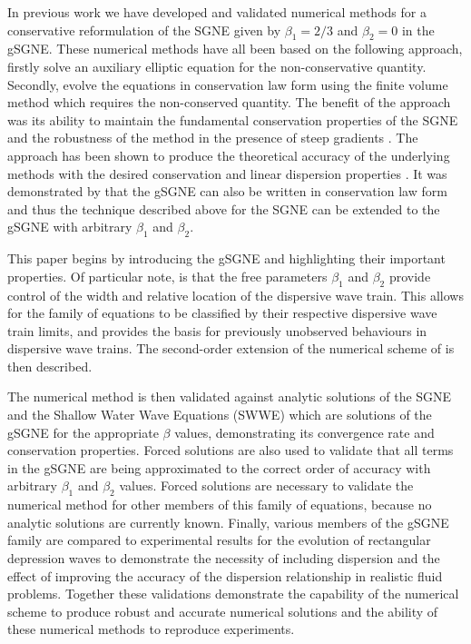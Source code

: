 \documentclass[10pt]{elsarticle}
\newcommand{\hl}[1]{{\color[rgb]{1,0,0}#1}}
\begin{document}
In previous work we have developed and validated numerical methods for a conservative reformulation of the SGNE \cite{Zoppou-2014,Zoppou-etal-2016,Zoppou-etal-2017,Pitt-2019} given by $\beta_1 = 2/3$ and $\beta_2 =0$ in the gSGNE. These numerical methods have all been based on the following approach, firstly solve an auxiliary elliptic equation for the non-conservative quantity. Secondly, evolve the equations in conservation law form using the finite volume method which requires the non-conserved quantity. The benefit of the approach was its ability to maintain the fundamental conservation properties of the SGNE \cite{Pitt-2019} and the robustness of the method in the presence of steep gradients \cite{Pitt-2018-61}. The approach has been shown to produce the theoretical accuracy of the underlying methods \cite{Zoppou-etal-2017,Pitt-2019} with the desired conservation and linear dispersion properties \cite{Pitt-2019}. It was demonstrated by \citet{Clamond-Dutykh-2018-237} that the gSGNE can also be written in conservation law form and thus the technique described above for the SGNE can be extended to the gSGNE with arbitrary $\beta_1$ and $\beta_2$.

This paper begins by introducing the gSGNE and highlighting their important properties. Of particular note, is that the free parameters $\beta_1$ and $\beta_2$ provide control of the width and relative location of the dispersive wave train. This allows for the family of equations to be classified by their respective dispersive wave train limits, and provides the basis for previously unobserved behaviours in dispersive wave trains. The second-order extension of the numerical scheme of \citet{Zoppou-etal-2017} is then described. 

The numerical method is then validated against analytic solutions of the SGNE and the Shallow Water Wave Equations (SWWE) which are solutions of the gSGNE for the appropriate $\beta$ values, demonstrating its convergence rate and conservation properties. Forced solutions are also used to validate that all terms in the gSGNE are being approximated to the correct order of accuracy with arbitrary $\beta_1$ and $\beta_2$ values. Forced solutions are necessary to validate the numerical method for other members of this family of equations, because no analytic solutions are currently known. \hl{Finally, various members of the gSGNE family are compared to experimental results for the evolution of rectangular depression waves to demonstrate the necessity of including dispersion and the effect of improving the accuracy of the dispersion relationship in realistic fluid problems.} Together these validations demonstrate the capability of the numerical scheme to produce robust and accurate numerical solutions and the ability of these numerical methods to reproduce experiments. 
\end{document}
